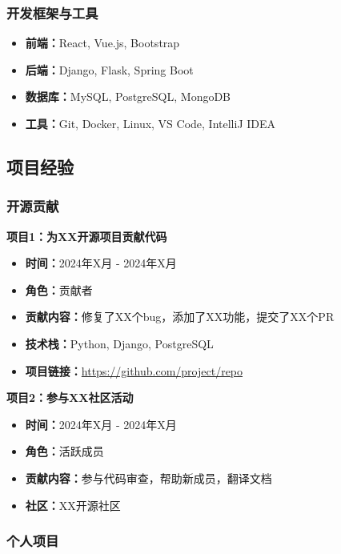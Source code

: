 \documentclass[a4paper,12pt]{article}
\begin{document}
\subsubsection{开发框架与工具}
\begin{itemize}
    \item \textbf{前端：}React, Vue.js, Bootstrap
    \item \textbf{后端：}Django, Flask, Spring Boot
    \item \textbf{数据库：}MySQL, PostgreSQL, MongoDB
    \item \textbf{工具：}Git, Docker, Linux, VS Code, IntelliJ IDEA
\end{itemize}

\subsection{项目经验}

\subsubsection{开源贡献}

\textbf{项目1：为XX开源项目贡献代码}
\begin{itemize}
    \item \textbf{时间：}2024年X月 - 2024年X月
    \item \textbf{角色：}贡献者
    \item \textbf{贡献内容：}修复了XX个bug，添加了XX功能，提交了XX个PR
    \item \textbf{技术栈：}Python, Django, PostgreSQL
    \item \textbf{项目链接：}\url{https://github.com/project/repo}
\end{itemize}

\textbf{项目2：参与XX社区活动}
\begin{itemize}
    \item \textbf{时间：}2024年X月 - 2024年X月
    \item \textbf{角色：}活跃成员
    \item \textbf{贡献内容：}参与代码审查，帮助新成员，翻译文档
    \item \textbf{社区：}XX开源社区
\end{itemize}

\subsubsection{个人项目}
\end{document}
